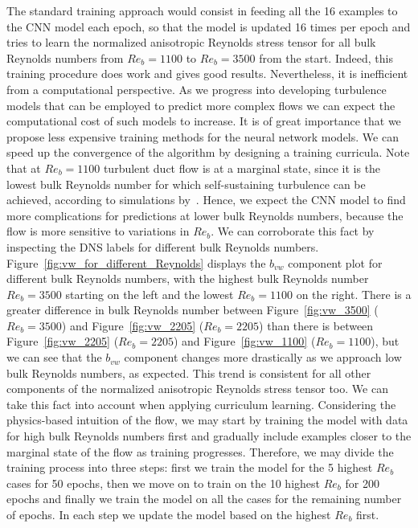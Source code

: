 \documentclass[11pt]{article}
\numberwithin{equation}{section}
\theoremstyle{plain}
\theoremstyle{definition}
\begin{document}
The standard training approach would consist in feeding all the 16 examples to the CNN model each epoch, so that the model is updated 16 times per epoch and tries to learn the normalized anisotropic Reynolds stress tensor for all bulk Reynolds numbers from $Re_{b}=1100$ to $Re_{b}=3500$ from the start. Indeed, this training procedure does work and gives good results. Nevertheless, it is inefficient from a computational perspective. As we progress into developing turbulence models that can be employed to predict more complex flows we can expect the computational cost of such models to increase. It is of great importance that we propose less expensive training methods for the neural network models. We can speed up the convergence of the algorithm by designing a training curricula. Note that at $Re_{b}=1100$ turbulent duct flow is at a marginal state, since it is the lowest bulk Reynolds number for which self-sustaining turbulence can be achieved, according to simulations by~\cite{marginal}. Hence, we expect the CNN model to find more complications for predictions at lower bulk Reynolds numbers, because the flow is more sensitive to variations in $Re_{b}$. We can corroborate this fact by inspecting the DNS labels for different bulk Reynolds numbers. Figure~\ref{fig:vw_for_different_Reynolds} displays the $b_{vw}$ component plot for different bulk Reynolds numbers, with the highest bulk Reynolds number $Re_{b}=3500$ starting on the left and the lowest $Re_{b}=1100$ on the right. There is a greater difference in bulk Reynolds number between Figure~\ref{fig:vw_3500} ($Re_{b}=3500$) and Figure~\ref{fig:vw_2205} ($Re_{b}=2205$) than there is between Figure~\ref{fig:vw_2205} ($Re_{b}=2205$) and Figure~\ref{fig:vw_1100} ($Re_{b}=1100$), but we can see that the $b_{vw}$ component changes more drastically as we approach low bulk Reynolds numbers, as expected. This trend is consistent for all other components of the normalized anisotropic Reynolds stress tensor too. We can take this fact into account when applying curriculum learning. Considering the physics-based intuition of the flow, we may start by training the model with data for high bulk Reynolds numbers first and gradually include examples closer to the marginal state of the flow as training progresses. Therefore, we may divide the training process into three steps: first we train the model for the 5 highest $Re_{b}$ cases for 50 epochs, then we move on to train on the 10 highest $Re_{b}$ for 200 epochs and finally we train the model on all the cases for the remaining number of epochs. In each step we update the model based on the highest $Re_{b}$ first.
\end{document}
